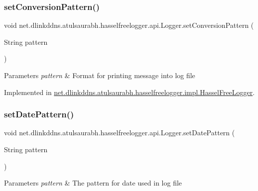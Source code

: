 \subsubsection{\texorpdfstring{set\+Conversion\+Pattern()}{setConversionPattern()}}
{\footnotesize\ttfamily void net.\+dlinkddns.\+atulsaurabh.\+hasselfreelogger.\+api.\+Logger.\+set\+Conversion\+Pattern (\begin{DoxyParamCaption}\item[{String}]{pattern }\end{DoxyParamCaption})}


\begin{DoxyParams}{Parameters}
{\em pattern} & Format for printing message into log file \\
\hline
\end{DoxyParams}


Implemented in \mbox{\hyperlink{classnet_1_1dlinkddns_1_1atulsaurabh_1_1hasselfreelogger_1_1impl_1_1_hassel_free_logger_a23a1e3b5c56528e197c7eb3832e7c69e}{net.\+dlinkddns.\+atulsaurabh.\+hasselfreelogger.\+impl.\+Hassel\+Free\+Logger}}.

\mbox{\label{interfacenet_1_1dlinkddns_1_1atulsaurabh_1_1hasselfreelogger_1_1api_1_1_logger_a80727ab10655fa0ca0c5249ec3ed45b8}} 
\subsubsection{\texorpdfstring{set\+Date\+Pattern()}{setDatePattern()}}
{\footnotesize\ttfamily void net.\+dlinkddns.\+atulsaurabh.\+hasselfreelogger.\+api.\+Logger.\+set\+Date\+Pattern (\begin{DoxyParamCaption}\item[{String}]{pattern }\end{DoxyParamCaption})}


\begin{DoxyParams}{Parameters}
{\em pattern} & The pattern for date used in log file \\
\hline
\end{DoxyParams}


